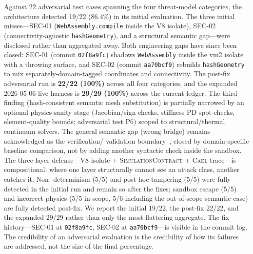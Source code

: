 \documentclass[letterpaper,twocolumn,10pt]{article}
\newcommand{\cael}{\textsc{Cael}}
\newcommand{\simcontract}{\textsc{SimulationContract}}
\begin{document}
Against 22 adversarial test cases spanning the four threat-model
categories, the architecture detected 19/22 (86.4\%) in its initial
evaluation. The three initial misses---SEC-01
(\texttt{WebAssembly.compile} inside the V8 isolate), SEC-02
(connectivity-agnostic \texttt{hashGeometry}), and a structural
semantic gap---were disclosed rather than aggregated away. Both
engineering gaps have since been closed: SEC-01 (commit
\texttt{02f8a9fc}) shadows \texttt{WebAssembly} inside the vm2
isolate with a throwing surface, and SEC-02 (commit \texttt{aa70bcf9})
rebuilds \texttt{hashGeometry} to mix separately-domain-tagged
coordinates and connectivity. The post-fix adversarial run is
\textbf{22/22 (100\%)} across all four categories, and the expanded
2026-05-06 live harness is \textbf{29/29 (100\%)} across the current
ledger. The third finding
(hash-consistent semantic mesh substitution) is partially narrowed by
an optional physics-sanity stage (Jacobian/sign checks, stiffness PD
spot-checks, element-quality bounds; adversarial test P6) scoped to
structural/thermal continuum solvers. The general semantic gap
(wrong bridge) remains acknowledged as the verification/
validation boundary~\cite{oberkampf2010verification}, closed by
domain-specific baseline comparison, not by adding another syntactic
check inside the sandbox. The three-layer defense---V8 isolate +
\simcontract{} + \cael{} trace---is compositional: where one layer
structurally cannot see an attack class, another catches it. Non-%
determinism (5/5) and post-hoc tampering (5/5) were fully detected
in the initial run and remain so after the fixes; sandbox escape
(5/5) and incorrect physics (5/5 in-scope, 5/6 including the
out-of-scope semantic case) are fully detected post-fix. We report
the initial 19/22, the post-fix 22/22, and the expanded 29/29 rather than
only the most flattering aggregate. The fix history---SEC-01 at
\texttt{02f8a9fc}, SEC-02 at \texttt{aa70bcf9}---is visible in the
commit log. The credibility of an adversarial evaluation is the
credibility of how its failures are addressed, not the size of the
final percentage.
\end{document}

